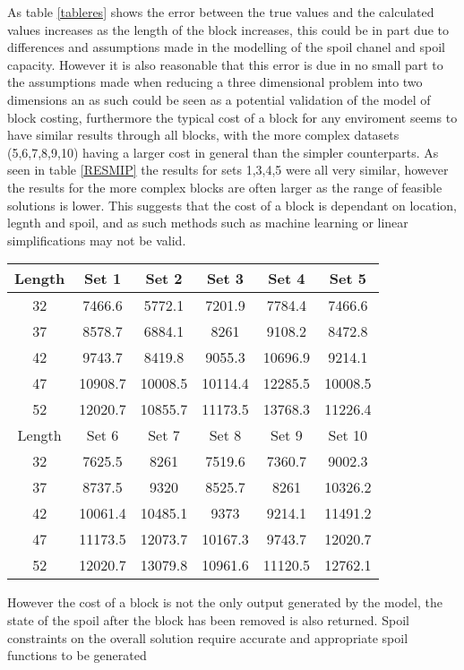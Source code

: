 As table \ref{tableres} shows the error between the true values and the calculated values increases as the length of the block increases, this could be in part due to differences and assumptions made in the modelling of the spoil chanel and spoil capacity. However it is also reasonable that this error is due in no small part to the assumptions made when reducing a three dimensional problem into two dimensions an as such could be seen as a potential validation of the model of block costing, furthermore the typical cost of a block for any enviroment seems to have similar results through all blocks, with the more complex datasets (5,6,7,8,9,10) having a larger cost in general than the simpler counterparts. As seen in table \ref{RESMIP} the results for sets 1,3,4,5 were all very similar, however the results for the more complex blocks are often larger as the range of feasible solutions is lower. This suggests that the cost of a block is dependant on location, legnth and spoil, and as such methods such as machine learning or linear simplifications may not be valid. 
\begin{center}
\begin{tabular}{ | c | c | c | c | c | c |}
\label{RESMIP}
\hline
	Length & Set 1 & Set 2 & Set 3 & Set 4 & Set 5  \\ \hline
	32 & 7466.6 & 5772.1 & 7201.9 & 7784.4 & 7466.6  \\ \hline
	37 & 8578.7 & 6884.1 & 8261 & 9108.2 & 8472.8  \\ \hline
	42 & 9743.7 & 8419.8 & 9055.3 & 10696.9 & 9214.1 \\ \hline
	47 & 10908.7 & 10008.5 & 10114.4 & 12285.5 & 10008.5 \\ \hline
	52 & 12020.7 & 10855.7 & 11173.5 & 13768.3 & 11226.4 \\ \hline
	\hline
	Length & Set 6 & Set 7 & Set 8 & Set 9 & Set 10  \\ \hline
	32 & 7625.5 & 8261 & 7519.6 & 7360.7 & 9002.3  \\ \hline
	37& 8737.5 & 9320 & 8525.7& 8261 & 10326.2  \\ \hline
	42 & 10061.4 & 10485.1 & 9373 & 9214.1 & 11491.2 \\ \hline
	47 & 11173.5 & 12073.7 & 10167.3 & 9743.7& 12020.7 \\ \hline
	52 & 12020.7 & 13079.8 & 10961.6 & 11120.5 & 12762.1  \\ \hline
	\hline
\end{tabular}
\end{center}
However the cost of a block is not the only output generated by the model, the state of the spoil after the block has been removed is also returned. Spoil constraints on the overall solution require accurate and appropriate spoil functions to be generated 